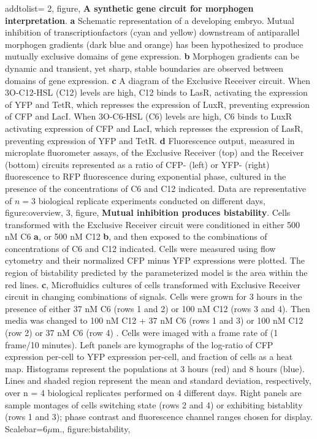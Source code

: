     addtolist={
        2, figure, {\textbf{A synthetic gene circuit for morphogen interpretation}. \textbf{a} Schematic representation of a developing embryo. Mutual inhibition of transcriptionfactors (cyan and yellow) downstream of antiparallel morphogen gradients (dark blue and orange) has been hypothesized to produce mutually exclusive domains of gene expression. \textbf{b} Morphogen gradients can be dynamic and transient, yet sharp, stable boundaries are observed between domains of gene expression. \textbf{c} A diagram of the Exclusive Receiver circuit. When 3O-C12-HSL (C12) levels are high, C12 binds to LasR, activating the expression of YFP and TetR, which represses the expression of LuxR, preventing expression of CFP and LacI. When 3O-C6-HSL (C6) levels are high, C6 binds to LuxR activating expression of CFP and LacI, which represses the expression of LasR, preventing expression of YFP and TetR. \textbf{d} Fluorescence output, measured in microplate fluorometer assays, of the Exclusive Receiver (top) and the Receiver (bottom) circuits represented as a ratio of CFP- (left) or YFP- (right) fluorescence to RFP fluorescence during exponential phase, cultured in the presence of the concentrations of C6 and C12 indicated. Data are representative of $n=3$ biological replicate experiments conducted on different days}, figure:overview,
        3, figure, {\textbf{Mutual inhibition produces bistability}. Cells transformed with the Exclusive Receiver circuit were conditioned in either 500 nM C6 \textbf{a}, or 500 nM C12 \textbf{b}, and then exposed to the combinations of concentrations of C6 and C12 indicated.  Cells were measured using flow cytometry and their normalized CFP minus YFP expressions were plotted. The region of bistability predicted by the parameterized model is the area within the red lines.  \textbf{c}, Microfluidics cultures of cells transformed with Exclusive Receiver circuit in changing combinations of signals.  Cells were grown for 3 hours in the presence of either 37 nM C6 (rows 1 and 2) or 100 nM C12 (rows 3 and 4). Then media was changed to 100 nM C12 + 37 nM C6 (rows 1 and 3) or 100 nM C12 (row 2) or 37 nM C6 (row 4) . Cells were imaged with a frame rate of (1 frame/10 minutes). Left panels are kymographs of the log-ratio of CFP expression per-cell to YFP expression per-cell, and fraction of cells as a heat map.  Histograms represent the populations at 3 hours (red) and 8 hours (blue).  Lines and shaded region represent the mean and standard deviation, respectively, over {n = 4  biological replicates performed on 4 different days.} Right panels are sample montages of cells switching state (rows 2 and 4) or exhibiting bistablity (rows 1 and 3); phase contrast and fluorescence channel ranges chosen for display. Scalebar=6$\mu$m.}, figure:bistability,
}

